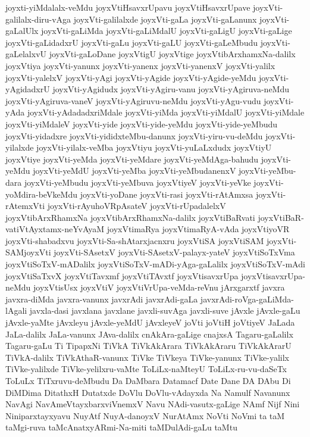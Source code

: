 {joyxti-yiMdalalx-veMdu
joyxVtiHsavxrUpavu
joyxVtiHsavxrUpave
joyxVti-galilalx-diru-vAga
joyxVti-galilalxde
joyxVti-gaLa
joyxVti-gaLanunx
joyxVti-gaLalUlx
joyxVti-gaLiMda
joyxVti-gaLiMdalU
joyxVti-gaLigU
joyxVti-gaLige
joyxVti-gaLidadxrU
joyxVti-gaLu
joyxVti-gaLU
joyxVti-gaLeMbudu
joyxVti-gaLelalxvU
joyxVti-gaLoDane
joyxVtigU
joyxVtige
joyxVtibArxhamxNa-dalilx
joyxVtiya
joyxVti-yanunx
joyxVti-yanenx
joyxVti-yanenxV
joyxVti-yalilx
joyxVti-yalelxV
joyxVti-yAgi
joyxVti-yAgide
joyxVti-yAgide-yeMdu
joyxVti-yAgidadxrU
joyxVti-yAgidudx
joyxVti-yAgiru-vanu
joyxVti-yAgiruva-neMdu
joyxVti-yAgiruva-vaneV
joyxVti-yAgiruvu-neMdu
joyxVti-yAgu-vudu
joyxVti-yAda
joyxVti-yAdadadxriMdale
joyxVti-yiMda
joyxVti-yiMdalU
joyxVti-yiMdale
joyxVti-yiMdaleV
joyxVti-yide
joyxVti-yide-yeMdu
joyxVti-yide-yeMbudu
joyxVti-yidadxre
joyxVti-yididxteMbu-danunx
joyxVti-yiru-vu-deMdu
joyxVti-yilalxde
joyxVti-yilalx-veMba
joyxVtiyu
joyxVti-yuLaLxdudx
joyxVtiyU
joyxVtiye
joyxVti-yeMda
joyxVti-yeMdare
joyxVti-yeMdAga-bahudu
joyxVti-yeMdu
joyxVti-yeMdU
joyxVti-yeMba
joyxVti-yeMbudanenxV
joyxVti-yeMbu-dara
joyxVti-yeMbudu
joyxVti-yeMbuva
joyxVtiyeV
joyxVti-yeVke
joyxVti-yoMdira-beVkeMdu
joyxVti-yoDane
joyxVti-rasi
joyxVti-rAtAmxsa
joyxVti-rAtemxVti
joyxVti-rAyuhoVRpAsateV
joyxVti-rUpadalelxV
joyxVtibArxRhamxNa
joyxVtibArxRhamxNa-dalilx
joyxVtiBaRvati
joyxVtiBaR-vatiVtAyxtamx-neYvAyaM
joyxVtimaRya
joyxVtimaRyA-vAda
joyxVtiyoVR
joyxVti-shabadxvu
joyxVti-Sa-shAtarxjacnxru
joyxVtiSA
joyxVtiSAM
joyxVti-SAMjoyxVti
joyxVti-SAsetxV
joyxVti-SAsetxV-palayx-yateV
joyxVtiSoTxVma
joyxVtiSoTxV-mADalilx
joyxVtiSoTxV-mADi-yAga-gaLalilx
joyxVtiSoTxV-mAdi
joyxVtiSaTxvX
joyxVtiTavxmf
joyxVtiTAvxtf
joyxVtisavxrUpa
joyxVtisavxrUpa-neMdu
joyxVtisUsx
joyxVtiV
joyxVtiVrUpa-veMda-reVnu
jArxgarxtf
javxra
javxra-diMda
javxra-vanunx
javxrAdi
javxrAdi-gaLa
javxrAdi-roVga-gaLiMda-lAgali
javxla-dasi
javxlana
javxlane
javxli-suvAga
javxli-suve
jAvxle
jAvxle-gaLu
jAvxle-yaMte
jAvxleyu
jAvxle-yeMdU
jAvxleyeV
joVti
joVtiH
joVtiyeV
JaLada
JaLa-dalilx
JaLa-vanunx
JAva-dalilx
cnAkAra-gaLige
cnajxsA
Tagaru-gaLalilx
Tagaru-gaLu
Ti
TipapxNi
TiVkA
TiVkAkArara
TiVkAkAraru
TiVkAkArarU
TiVkA-dalilx
TiVkAthaR-vanunx
TiVke
TiVkeya
TiVke-yanunx
TiVke-yalilx
TiVke-yalilxde
TiVke-yelilxru-vaMte
ToLiLx-naMteyU
ToLiLx-ru-vu-daSeTx
ToLuLx
TiTxruvu-deMbudu
Da
DaMbara
Datamacf
Date
Dane
DA
DAbu
Di
DiMDima
DitathxH
Dutatxde
DoVlu
DoVlu-vAdayxda
Na
Namulf
Navanunx
NavAgi
NavAmeVtayxbarxviVnemxV
Navu
NAdi-vasutx-gaLige
NAmf
Nijf
Nini
Niniparxtayxyavu
NuyAtf
NuyA-danoyxV
NurAtAmx
NoVti
NoVmi
ta
taM
taMgi-ruva
taMcAnatxyARmi-Na-miti
taMDulAdi-gaLu
taMtu
}
